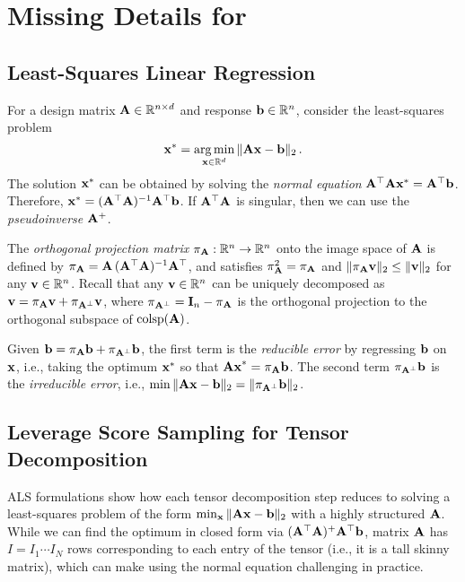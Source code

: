 \section{Missing Details for }

\subsection{Least-Squares Linear Regression}
\label{app:least-square-regression}

For a design matrix $\mathbf{A}\in \mathbb{R}^{n\times d}$ and response $\mathbf{b}\in \mathbb{R}^n$, consider the least-squares problem
\[
    \mathbf{x}^* = \operatorname*{arg\,min}_{\mathbf{x}\in \mathbb{R}^d}\,\lVert\mathbf{Ax}-\mathbf{b}\rVert_2\,.
\]
The solution $\mathbf{x}^*$ can be obtained by solving the \emph{normal equation} $\mathbf{A}^\top\mathbf{A}\mathbf{x}^*=\mathbf{A}^\top \mathbf{b}$.
Therefore, $\mathbf{x}^* = (\mathbf{A}^\top\mathbf{A})^{-1}\mathbf{A}^\top \mathbf{b}$.
If $\mathbf{A}^\top\mathbf{A}$ is singular, then we can use the \emph{pseudoinverse} $\mathbf{A}^+$.

The \emph{orthogonal projection matrix} $\pi_{\mathbf{A}}:\mathbb{R}^n \to \mathbb{R}^n$ onto the image space of $\mathbf{A}$ is defined by
$\pi_{\mathbf{A}} = \mathbf{A}\,(\mathbf{A}^\top\mathbf{A})^{-1}\mathbf{A}^\top$, and satisfies $\pi_{\mathbf{A}}^2 = \pi_{\mathbf{A}}$ and $\lVert\pi_{\mathbf{A}}\mathbf{v}\rVert_2 \leq \lVert\mathbf{v}\rVert_2$ for any $\mathbf{v} \in \mathbb{R}^n$. 
Recall that any $\mathbf{v}\in \mathbb{R}^n$ can be uniquely decomposed as $\mathbf{v} = \pi_{\mathbf{A}}\mathbf{v} + \pi_{\mathbf{A}^\perp}\mathbf{v}$, where $\pi_{\mathbf{A}^\perp}=\mathbf{I}_{n} - \pi_{\mathbf{A}}$ is the orthogonal projection to the orthogonal subspace of $\textnormal{colsp}(\mathbf{A})$.

Given $\mathbf{b} = \pi_{\mathbf{A}}\mathbf{b} + \pi_{\mathbf{A} ^\perp}\mathbf{b}$, the first term is the \emph{reducible error} by regressing $\mathbf{b}$ on $\mathbf{x}$,
i.e., taking the optimum $\mathbf{x}^*$ so that $\mathbf{Ax}^* = \pi_{\mathbf{A}}\mathbf{b}$.
The second term  $\pi_{\mathbf{A}^\perp}\mathbf{b}$ is the \emph{irreducible error}, i.e., $\min\,\lVert\mathbf{Ax}-\mathbf{b}\rVert_2 =\lVert\pi_{\mathbf{A}^\perp}\mathbf{b}\rVert_2$.


\subsection{Leverage Score Sampling for Tensor Decomposition}
\label{app:leverage-score}

ALS formulations show how each tensor decomposition step reduces to solving a least-squares problem of the form
$\min_{\mathbf{x}}\,\lVert\mathbf{A}\mathbf{x} - \mathbf{b}\rVert_2$ with a highly structured $\mathbf{A}$.
While we can find the optimum in closed form via $(\mathbf{A}^\top \mathbf{A})^{+} \mathbf{A}^\top \mathbf{b}$, matrix $\mathbf{A}$ has $I = I_1 \cdots I_N$ rows corresponding to each entry of the tensor (i.e., it is a tall skinny matrix), which can make using the normal equation challenging in practice.

